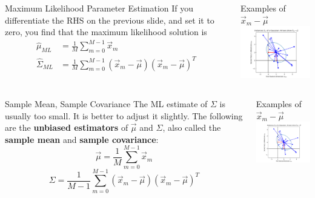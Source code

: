 \documentclass{beamer}
\begin{document}
\begin{frame}
  \begin{columns}
    \column{2.25in}
    \begin{block}{Maximum Likelihood Parameter Estimation}
      If you differentiate the RHS on the previous slide, and set it
      to zero, you find that the maximum likelihood solution is
      \begin{align*}
        \hat{\mu}_{ML} &= \frac{1}{M}\sum_{m=0}^{M-1}\vec{x}_m\\
        \hat{\Sigma}_{ML} &= \frac{1}{M}\sum_{m=0}^{M-1}(\vec{x}_m-\vec\mu)(\vec{x}_m-\vec\mu)^T
      \end{align*}
    \end{block}
    \column{2in}
    \begin{block}{Examples of $\vec{x}_m-\vec\mu$}
      \includegraphics[width=1.9in]{gaussian_subtraction.png}
    \end{block}
  \end{columns}
\end{frame}

\begin{frame}
  \begin{columns}
    \column{2.25in}
    \begin{block}{Sample Mean, Sample Covariance}
      The ML estimate of $\Sigma$ is usually too small.  It is better
      to adjust it slightly.  The following are the {\bf unbiased
        estimators} of $\vec\mu$ and $\Sigma$, also called the {\bf
        sample mean} and {\bf sample covariance}:
      \[
      \vec\mu=\frac{1}{M}\sum_{m=0}^{M-1}\vec{x}_m
      \]
      \[
      \Sigma=\frac{1}{M-1}\sum_{m=0}^{M-1}(\vec{x}_m-\vec\mu)(\vec{x}_m-\vec\mu)^T
      \]
    \end{block}
    \column{2in}
    \begin{block}{Examples of $\vec{x}_m-\vec\mu$}
      \includegraphics[width=1.9in]{gaussian_subtraction.png}
    \end{block}
  \end{columns}
\end{frame}
\end{document}

